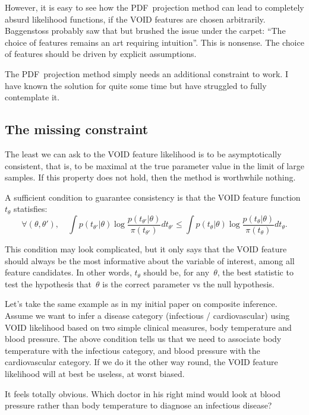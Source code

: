 \documentclass[english]{scrartcl}
\begin{document}
However, it is easy to see how the PDF~projection method can lead to completely absurd likelihood functions, if the VOID features are chosen arbitrarily. Baggenstoss probably saw that but brushed the issue under the carpet: ``The choice of features remains an art requiring intuition''. This is nonsense. The choice of features should be driven by explicit assumptions.

The PDF~projection method simply needs an additional constraint to work. I have known the solution for quite some time but have struggled to fully contemplate it.

\subsection{The missing constraint}

The least we can ask to the VOID feature likelihood is to be asymptotically consistent, that is, to be maximal at the true parameter value in the limit of large samples. If this property does not hold, then the method is worthwhile nothing.

A sufficient condition to guarantee consistency is that the VOID feature function $t_\theta$ statisfies:
$$
\forall (\theta, \theta'),
\quad
\int p(t_{\theta'}|\theta) \log \frac{p(t_{\theta'}|\theta)}{\pi(t_{\theta'})} dt_{\theta'}
  \leq
\int p(t_{\theta}|\theta) \log \frac{p(t_{\theta}|\theta)}{\pi(t_{\theta})} dt_{\theta}
.
$$

This condition may look complicated, but it only says that the VOID feature should always be the most informative about the variable of interest, among all feature candidates. In other words, $t_\theta$ should be, for any~$\theta$, the best statistic to test the hypothesis that~$\theta$ is the correct parameter vs the null hypothesis.

Let's take the same example as in my initial paper on composite inference. Assume we want to infer a disease category (infectious / cardiovascular) using VOID likelihood based on two simple clinical measures, body temperature and blood pressure. The above condition tells us that we need to associate body temperature with the infectious category, and blood pressure with the cardiovascular category. If we do it the other way round, the VOID feature likelihood will at best be useless, at worst biased.

It feels totally obvious. Which doctor in his right mind would look at blood pressure rather than body temperature to diagnose an infectious disease? 
\end{document}

